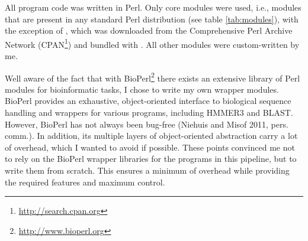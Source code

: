 All program code was written in Perl. Only core modules were used, i.e., modules
that are present in any standard Perl distribution (see table \ref{tab:modules}),
with the exception of  \citep{shan2001}, which was downloaded from
the Comprehensive Perl Archive Network
(CPAN\footnote{\url{http://search.cpan.org}}) and bundled with \pname. All other
modules were custom-written by me.



Well aware of the fact that with BioPerl\footnote{\url{http://www.bioperl.org}}
there exists an extensive library of Perl modules for bioinformatic tasks, I
chose to write my own wrapper modules. BioPerl provides an exhaustive,
object-oriented interface to biological sequence handling and wrappers for
various programs, including HMMER3 and BLAST. However, BioPerl has not always
been bug-free (Niehuis and Misof 2011, pers. comm.). In addition, its multiple
layers of object-oriented abstraction carry a lot of overhead, which I wanted to
avoid if possible. These points convinced me not to rely on the BioPerl wrapper
libraries for the programs in this pipeline, but to write them from scratch.
This ensures a minimum of overhead while providing the required features and
maximum control.
